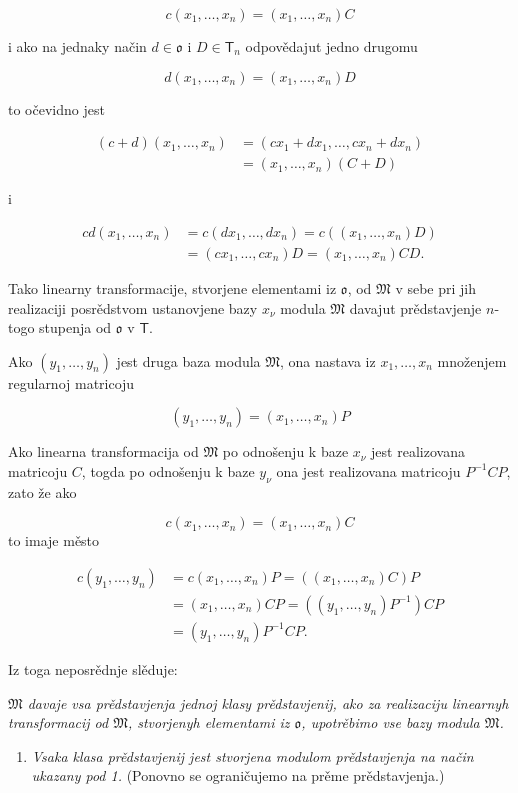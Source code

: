 \documentclass[11pt]{article}
\providecommand{\tightlist}{\setlength{\itemsep}{0pt}\setlength{\parskip}{0pt}}
\begin{document}
\[
c(x_1,\ldots,x_n)=(x_1,\ldots,x_n)C
\]

i ako na jednaky način \(d\in\mathfrak{o}\) i \(D\in\mathsf T_n\) odpovědajut jedno drugomu

\[
d(x_1,\ldots,x_n)=(x_1,\ldots,x_n)D
\]

to očevidno jest

\[
\begin{aligned}
(c+d)(x_1,\ldots,x_n)
&=(cx_1+dx_1,\ldots,cx_n+dx_n)\\
&=(x_1,\ldots,x_n)(C+D)
\end{aligned}
\]

i

\[
\begin{aligned}
cd(x_1,\ldots,x_n)
&=c(dx_1,\ldots,dx_n)=c((x_1,\ldots,x_n)D)\\
&=(cx_1,\ldots,cx_n)D=(x_1,\ldots,x_n)CD.
\end{aligned}
\]

Tako linearny transformacije, stvorjene elementami iz \(\mathfrak{o}\), od \(\mathfrak M\) v sebe pri jih realizaciji posrědstvom ustanovjene bazy \(x_\nu\) modula \(\mathfrak M\) davajut prědstavjenje \(n\)-togo stupenja od \(\mathfrak{o}\) v \(\mathsf T\).

Ako \((y_1,\ldots,y_n)\) jest druga baza modula \(\mathfrak M\), ona nastava iz \(x_1,\ldots,x_n\) množenjem regularnoj matricoju

\[(y_1,\ldots,y_n)=(x_1,\ldots,x_n)P\]

Ako linearna transformacija od \(\mathfrak M\) po odnošenju k baze \(x_\nu\) jest realizovana matricoju \(C\), togda po odnošenju k baze \(y_\nu\) ona jest realizovana matricoju \(P^{-1}CP\), zato že ako

\[c(x_1,\ldots,x_n)=(x_1,\ldots,x_n)C\]
to imaje město

\[
\begin{aligned}
c(y_1,\ldots,y_n)
&=c(x_1,\ldots,x_n)P=((x_1,\ldots,x_n)C)P\\
&=(x_1,\ldots,x_n)CP=((y_1,\ldots,y_n)P^{-1})CP\\
&=(y_1,\ldots,y_n)P^{-1}CP.
\end{aligned}
\]

Iz toga neposrědnje slěduje:

\emph{\(\mathfrak M\) davaje vsa prědstavjenja jednoj klasy prědstavjenij, ako za realizaciju linearnyh transformacij od \(\mathfrak M\), stvorjenyh elementami iz \(\mathfrak{o}\), upotrěbimo vse bazy modula \(\mathfrak M\).}

\begin{enumerate}
\def\labelenumi{\arabic{enumi}.}
\setcounter{enumi}{1}
\tightlist
\item
  \emph{Vsaka klasa prědstavjenij jest stvorjena modulom prědstavjenja na način ukazany pod 1.} (Ponovno se ograničujemo na prěme prědstavjenja.)
\end{enumerate}
\end{document}
